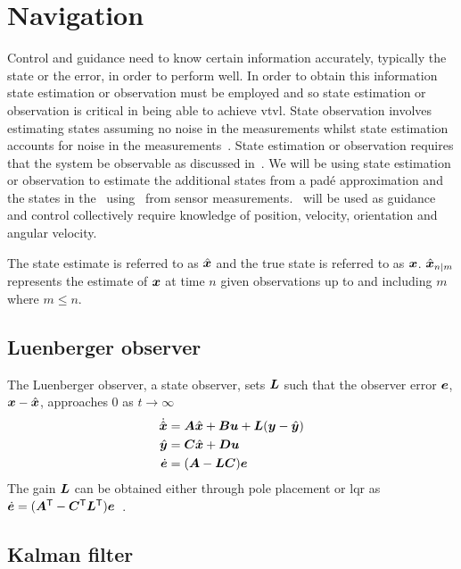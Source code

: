 \section{Navigation} 
\label{sec:Navigation}

Control and guidance need to know certain information accurately, typically the state or the error, in order to perform well. 
In order to obtain this information state estimation or observation must be employed and so state estimation or observation is critical in being able to achieve \gls{vtvl}.
State observation involves estimating states assuming no noise in the measurements whilst state estimation accounts for noise in the measurements~\cite{Qi2018, Bur2012}.
State estimation or observation requires that the system be observable as discussed in~.
We will be using state estimation or observation to estimate the additional states from a padé approximation and the states in the~ using~ from sensor measurements.~ will be used as guidance and control collectively require knowledge of position, velocity, orientation and angular velocity.

The state estimate is referred to as $\hat{\bm{x}}$ and the true state is referred to as $\bm x$. 
$\hat{\bm{x}}_{n \mid m}$ represents the estimate of $\bm x$ at time $n$ given observations up to and including $m$ where $m \leq n$. 
%
\subsection{Luenberger observer}

The Luenberger observer, a state observer, sets $\bm L$ such that the observer error $\bm e$, $\bm x - \hat{\bm{x}}$, approaches 0 as $t \to \infty$
\begin{align}
    \dot{ \hat{\bm{x}} } &= \bm A \hat{\bm{x}} + \bm B \bm u + \bm L (\bm y - \hat{\bm{y}}) \\
    \hat{\bm y} &= \bm C \hat{\bm{x}} + \bm{Du} \\
    \dot{ \bm e } &= (\bm A - \bm L \bm C) \bm e
\end{align}
The gain $\bm L$ can be obtained either through pole placement or \gls{lqr} as $\dot{ \bm e } = (\bm A^\mathsf{T} - \bm C^\mathsf{T} \bm L^\mathsf{T}) \bm e$~\cite{fri2005}.
%
\subsection{Kalman filter}

